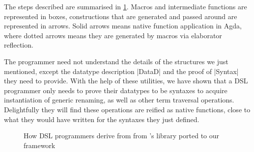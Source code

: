 \documentclass[sigplan,review,fleqn]{acmart}
\renewcommand{\verb}{\collectverb{\color{AgdaFunction}}}
\begin{document}
The steps described are summarised in \cref{fig:flow}. 
Macros and intermediate functions are represented in boxes, constructions that are generated and passed around are represented in arrows.
Solid arrows means native function application in Agda, where dotted arrows means they are generated by macros via elaborator reflection.

The programmer need not understand the details of the structures we just mentioned, except the datatype description \verb|DataD| and the proof of \verb|Syntax| they need to provide.
With the help of these utilities, we have shown that a DSL programmer only needs to prove their datatypes to be syntaxes to acquire instantiation of generic renaming, as well as other term traversal operations.
Delightfully they will find these operations are reified as native functions, close to what they would have written for the syntaxes they just defined.

\begin{figure}
	\centering
	\caption{How DSL programmers derive  from  from \citeauthor{Allais-generic-syntax}'s library ported to our framework}
	\label{fig:flow}
\end{figure}
\end{document}

